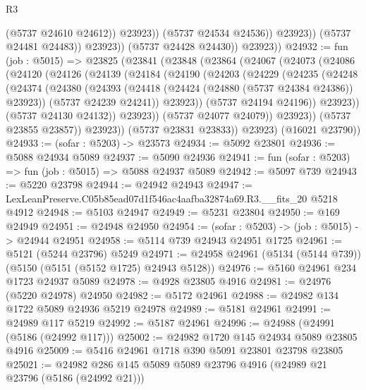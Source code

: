 \begin{lexlean}{R3}
\begin{coremodule}
                            (@5737 @24610 @24612))
                          @23923))
                      (@5737 @24534 @24536))
                    @23923))
                (@5737 @24481 @24483))
              @23923))
          (@5737 @24428 @24430))
        @23923))
@24932 := fun (job : @5015) =>
  @23825
    (@23841
      (@23848
        (@23864
          (@24067
            (@24073
              (@24086
                (@24120
                  (@24126
                    (@24139
                      (@24184
                        (@24190
                          (@24203
                            (@24229
                              (@24235
                                (@24248
                                  (@24374
                                    (@24380
                                      (@24393
                                        (@24418 (@24424 (@24880 (@5737 @24384 @24386)) @23923))
                                        (@5737 @24239 @24241))
                                      @23923))
                                  (@5737 @24194 @24196))
                                @23923))
                            (@5737 @24130 @24132))
                          @23923))
                      (@5737 @24077 @24079))
                    @23923))
                (@5737 @23855 @23857))
              @23923))
          (@5737 @23831 @23833))
        @23923)
      (@16021 @23790))
@24933 := (sofar : @5203) -> @23573
@24934 := @5092 @23801
@24936 := @5088 @24934 @5089
@24937 := @5090 @24936
@24941 := fun (sofar : @5203) => fun (job : @5015) => @5088 @24937 @5089
@24942 := @5097 @739
@24943 := @5220 @23798
@24944 := @24942 @24943
@24947 := LexLeanPreserve.C05b85ead07d1f546ac4aafba32874a69.R3.__fits_20 @5218 @4912
@24948 := @5103 @24947
@24949 := @5231 @23804
@24950 := @169 @24949
@24951 := @24948 @24950
@24954 := (sofar : @5203) -> (job : @5015) -> @24944 @24951
@24958 := @5114 @739 @24943 @24951 @1725
@24961 := @5121 (@5244 @23796) @5249
@24971 := @24958 @24961 (@5134 (@5144 @739)) (@5150 (@5151 (@5152 @1725) @24943 @5128))
@24976 := @5160 @24961 @234 @1723 @24937 @5089
@24978 := @4928 @23805 @4916
@24981 := @24976 (@5220 @24978) @24950
@24982 := @5172 @24961
@24988 := @24982 @134 @1722 @5089 @24936 @5219 @24978
@24989 := @5181 @24961
@24991 := @24989 @117 @5219
@24992 := @5187 @24961
@24996 := @24988 (@24991 (@5186 (@24992 @117)))
@25002 := @24982 @1720 @145 @24934 @5089 @23805 @4916
@25009 := @5416 @24961 @1718 @390 @5091 @23801 @23798 @23805
@25021 := @24982 @286 @145 @5089 @5089 @23796 @4916 (@24989 @21 @23796 (@5186 (@24992 @21)))

\end{coremodule}
\end{lexlean}
